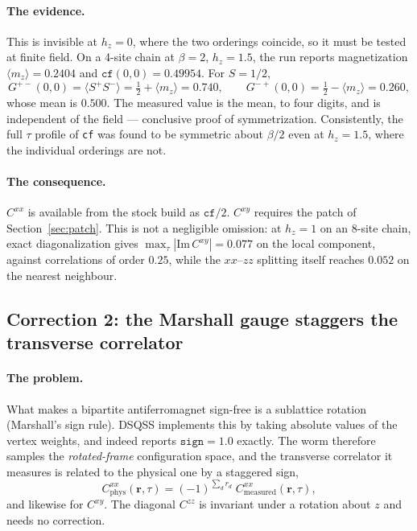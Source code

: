 \documentclass[11pt,a4paper]{article}
\newcommand{\Sp}{S^{+}}
\newcommand{\Sm}{S^{-}}
\newcommand{\Gpm}{G^{+-}}
\newcommand{\Gmp}{G^{-+}}
\newcommand{\code}[1]{\texttt{#1}}
\begin{document}
\paragraph{The evidence.} This is invisible at $h_z=0$, where the two orderings
coincide, so it must be tested at finite field. On a 4-site chain at
$\beta=2$, $h_z=1.5$, the run reports magnetization
$\langle m_z\rangle = 0.2404$ and $\code{cf}(0,0)=0.49954$. For $S=1/2$,
\begin{equation}
  \Gpm(0,0)=\langle \Sp\Sm\rangle = \tfrac12+\langle m_z\rangle = 0.740,
  \qquad
  \Gmp(0,0)=\tfrac12-\langle m_z\rangle = 0.260 ,
\end{equation}
whose mean is $0.500$. The measured value is the mean, to four digits, and is
independent of the field --- conclusive proof of symmetrization. Consistently,
the full $\tau$ profile of \code{cf} was found to be symmetric about $\beta/2$
even at $h_z=1.5$, where the individual orderings are not.

\paragraph{The consequence.} $C^{xx}$ is available from the stock build as
$\code{cf}/2$. $C^{xy}$ requires the patch of Section~\ref{sec:patch}. This is
not a negligible omission: at $h_z=1$ on an 8-site chain, exact diagonalization
gives $\max_\tau|\mathrm{Im}\,C^{xy}|=0.077$ on the local component, against
correlations of order $0.25$, while the $xx$--$zz$ splitting itself reaches
$0.052$ on the nearest neighbour.

\subsection{Correction 2: the Marshall gauge staggers the transverse correlator}

\paragraph{The problem.} What makes a bipartite antiferromagnet sign-free is a
sublattice rotation (Marshall's sign rule). DSQSS implements this by taking
absolute values of the vertex weights, and indeed reports
$\code{sign}=1.0$ exactly. The worm therefore samples the
\emph{rotated-frame} configuration space, and the transverse correlator it
measures is related to the physical one by a staggered sign,
\begin{equation}
  C^{xx}_{\text{phys}}(\mathbf{r},\tau)
  = (-1)^{\sum_d r_d}\; C^{xx}_{\text{measured}}(\mathbf{r},\tau),
\end{equation}
and likewise for $C^{xy}$. The diagonal $C^{zz}$ is invariant under a rotation
about $z$ and needs no correction.
\end{document}

